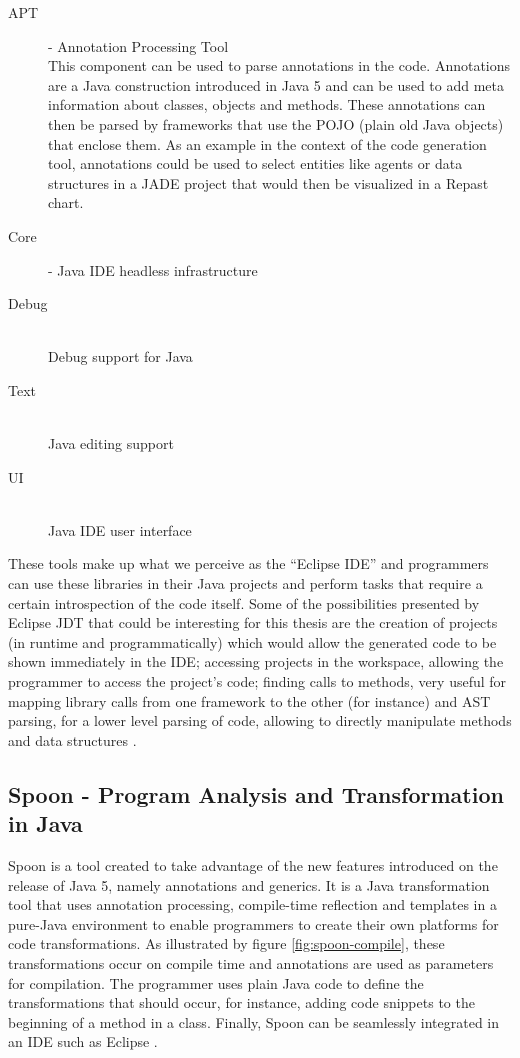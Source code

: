 	\begin{description}
		\item[APT] - Annotation Processing Tool\hfill \\
  			This component can be used to parse annotations in the code. Annotations are a Java construction introduced in Java 5 and can be used to add meta information about classes, objects and methods. These annotations can then be parsed by frameworks that use the POJO (plain old Java objects) that enclose them. As an example in the context of the code generation tool, annotations could be used to select entities like agents or data structures in a JADE project that would then be visualized in a Repast chart.
		\item[Core] - Java IDE headless infrastructure \hfill \\
  			
		\item[Debug] \hfill \\
  			Debug support for Java
		\item[Text] \hfill \\
  			Java editing support
		\item[UI] \hfill \\
  			Java IDE user interface 
	\end{description}

	These tools make up what we perceive as the ``Eclipse IDE'' and programmers can use these libraries in their Java projects and perform tasks that require a certain introspection of the code itself. Some of the possibilities presented by Eclipse JDT that could be interesting for this thesis are the creation of projects (in runtime and programmatically) which would allow the generated code to be shown immediately in the IDE; accessing projects in the workspace, allowing the programmer to access the project's code; finding calls to methods, very useful for mapping library calls from one framework to the other (for instance) and AST parsing, for a lower level parsing of code, allowing to directly manipulate methods and data structures \cite{eclipseJDT}.


\subsection{Spoon - Program Analysis and Transformation in Java}
	Spoon is a tool created to take advantage of the new features introduced on the release of Java 5, namely annotations and generics. It is a Java transformation tool that uses annotation processing, compile-time reflection and templates in a pure-Java environment to enable programmers to create their own platforms for code transformations. As illustrated by figure \ref{fig:spoon-compile}, these transformations occur on compile time and annotations are used as parameters for compilation. The programmer uses plain Java code to define the transformations that should occur, for instance, adding code snippets to the beginning of a method in a class. Finally, Spoon can be seamlessly integrated in an IDE such as Eclipse \cite{spoon,pawlak2006spoon}.

